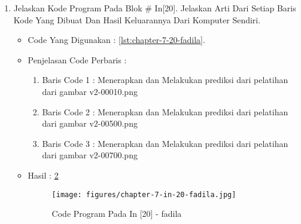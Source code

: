 \begin{enumerate}
\begin{itemize}
\begin{enumerate}
\item Baris Code 6	: Menampilkan dan mencetak hasil dari variabel prediction dan inverted
\end{enumerate}
\par
\par
\item Hasil : \ref{chapter-7-in-19-fadila}
\par
\par
\begin{figure}[!hbtp]
\centering
\texttt{[image: figures/chapter-7-in-19-fadila.jpg]}
\caption{Code Program Pada In [19] - fadila}
\label{chapter-7-in-19-fadila}
\end{figure}
\par
\par
\end{itemize}
\par
\par
\par
\item Jelaskan Kode Program Pada Blok \# In[20]. Jelaskan Arti Dari Setiap Baris Kode Yang Dibuat Dan Hasil Keluarannya Dari Komputer Sendiri.
\begin{itemize}
\item Code Yang Digunakan : \ref{lst:chapter-7-20-fadila}.

\par
\par
\item Penjelasan Code Perbaris	: 
\begin{enumerate}
\item Baris Code 1	: Menerapkan dan Melakukan prediksi dari pelatihan dari gambar v2-00010.png
\item Baris Code 2	: Menerapkan dan Melakukan prediksi dari pelatihan dari gambar v2-00500.png
\item Baris Code 3	: Menerapkan dan Melakukan prediksi dari pelatihan dari gambar v2-00700.png
\end{enumerate}
\par
\item Hasil : \ref{chapter-7-in-20-fadila}
\par
\par
\begin{figure}[!hbtp]
\centering
\texttt{[image: figures/chapter-7-in-20-fadila.jpg]}
\caption{Code Program Pada In [20] - fadila}
\label{chapter-7-in-20-fadila}
\end{figure}
\par
\par
\end{itemize}
\par
\par
\par
\end{enumerate}


